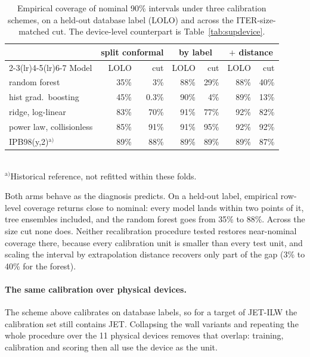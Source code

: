 \documentclass[12pt,letterpaper]{article}
\begin{document}
\begin{table}[t]
\centering
\small
\caption{Empirical coverage of nominal 90\% intervals under three calibration
schemes, on a held-out database label (LOLO) and across the ITER-size-matched
cut. The device-level counterpart is Table~\ref{tab:supdevice}.}
\label{tab:supshift}
\begin{tabular}{lrrrrrr}
\toprule
& \multicolumn{2}{c}{split conformal} & \multicolumn{2}{c}{by label}
& \multicolumn{2}{c}{$+$ distance} \\
\cmidrule(lr){2-3}\cmidrule(lr){4-5}\cmidrule(lr){6-7}
Model & LOLO & cut & LOLO & cut & LOLO & cut \\
\midrule
random forest & 35\% & 3\% & 88\% & 29\% & 88\% & 40\% \\
hist grad.\ boosting & 45\% & 0.3\% & 90\% & 4\% & 89\% & 13\% \\
ridge, log-linear & 83\% & 70\% & 91\% & 77\% & 92\% & 82\% \\
power law, collisionless & 85\% & 91\% & 91\% & 95\% & 92\% & 92\% \\
IPB98(y,2)$^{\mathrm{a)}}$ & 89\% & 88\% & 89\% & 89\% & 89\% & 87\% \\
\bottomrule
\end{tabular}
\\[2pt]
{\footnotesize $^{\mathrm{a)}}$Historical reference, not refitted within these folds.}
\par\smallskip{}
\end{table}

Both arms behave as the diagnosis predicts. On a held-out label, empirical
row-level coverage returns close to nominal: every model lands within two points
of it, tree ensembles included, and the random forest goes from 35\% to 88\%.
Across the size cut none does. Neither recalibration procedure tested restores
near-nominal coverage there, because every calibration unit is smaller than
every test unit, and scaling the interval by extrapolation distance recovers
only part of the gap (3\% to 40\% for the forest).

\paragraph{The same calibration over physical devices.} The scheme above
calibrates on database labels, so for a target of JET-ILW the calibration set
still contains JET. Collapsing the wall variants and repeating the whole
procedure over the 11 physical devices removes that overlap: training,
calibration and scoring then all use the device as the unit.
\end{document}

